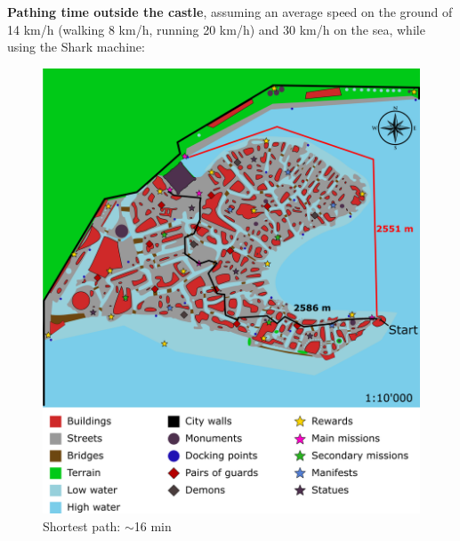 \textbf{Pathing time outside the castle}, assuming an average speed on the ground of 14 km/h (walking 8 km/h, running 20 km/h) and 30 km/h on the sea, while using the Shark machine:
\begin{figure}[H]
    \centering
	\includegraphics[width=\textwidth]{Images/Diagrams/dynamiapath1.png}
	\caption{Shortest path: $\sim$16 min}
\end{figure}


